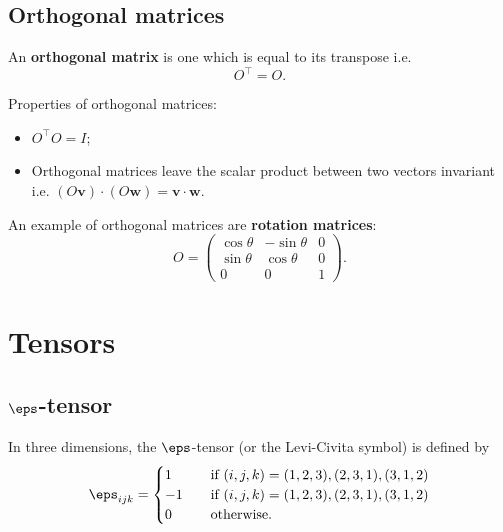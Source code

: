 \documentclass[12pt, a4paper]{article}
\begin{document}
\subsection{Orthogonal matrices}

\begin{definition}
    An \textbf{orthogonal matrix} is one which is equal to its transpose i.e. 
    \[O^{\top} = O.\]
\end{definition}

\begin{mdthm}
    Properties of orthogonal matrices:
    \begin{itemize}
        \item \(O^{\top} O  = I\);
        \item Orthogonal matrices leave the scalar product between two vectors invariant i.e. \(\left( O \bm{v} \right) \cdot \left( O \bm{w} \right) = \bm{v} \cdot \bm{w}\).
    \end{itemize}
\end{mdthm}

\begin{mdexample}
    An example of orthogonal matrices are \textbf{rotation matrices}:
    \[O = \begin{pmatrix}
        \cos\theta & -\sin\theta & 0 \\
        \sin\theta & \cos\theta & 0 \\
        0 & 0 & 1
    \end{pmatrix}.\]
\end{mdexample}

\section{Tensors}

\subsection{\texorpdfstring{\(\eps\)}{TEXT}-tensor}

\begin{definition}
    In three dimensions, the \(\eps\)-tensor (or the Levi-Civita symbol) is defined by 
    \[\begin{aligned}
        \eps_{ijk} =\begin{cases}
            1 \quad &\text{if } (i,j,k) = (1,2,3),(2,3,1),(3,1,2)\\
            -1 \quad &\text{if } (i,j,k) = (1,2,3),(2,3,1),(3,1,2)\\
            0 \quad &\text{otherwise.}
        \end{cases}
    \end{aligned}\]
\end{definition}
\end{document}
